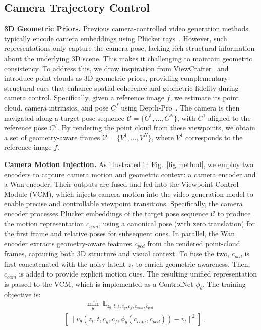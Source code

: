 \subsection{Camera Trajectory Control}
\label{sec:CMM}
\noindent\textbf{3D Geometric Priors.}
Previous camera-controlled video generation methods typically encode camera embeddings using Pl{\"u}cker rays~\cite{bahmani2024ac3d, liang2024wonderland}. 
However, such representations only capture the camera pose, lacking rich structural information about the underlying 3D scene. This makes it challenging to maintain geometric consistency. To address this, we draw inspiration from ViewCrafter~\cite{yu2024viewcrafter} and introduce point clouds as 3D geometric priors, providing complementary structural cues that enhance spatial coherence and geometric fidelity during camera control.
Specifically, given a reference image $f$, we estimate its point cloud, camera intrinsics, and pose $C^f$ using Depth-Pro~\cite{bochkovskii2024depth}. 
The camera is then navigated along a target pose sequence $\mathcal{C} = \{C^1, \ldots, C^N\}$, 
with $C^1$ aligned to the reference pose $C^f$.
By rendering the point cloud from these viewpoints, we obtain a set of geometry-aware frames 
$\mathcal{V} = \{V^{1}, \ldots, V^{N}\}$, where $V^{1}$ corresponds to the reference image $f$.

\vspace{1mm}
\noindent\textbf{Camera Motion Injection.} 
As illustrated in Fig.~\ref{fig:method}, we employ two encoders to capture camera motion and geometric context: a camera encoder and a Wan encoder. Their outputs are fused and fed into the Viewpoint Control Module (VCM), which injects camera motion into the video generation model to enable precise and controllable viewpoint transitions.
Specifically, the camera encoder processes Pl{\"u}cker embeddings of the target pose sequence $\mathcal{C}$ to produce the motion representation $c_{{cam}}$, 
using a canonical pose (with zero translation) for the first frame and relative poses for subsequent ones. 
In parallel, the Wan encoder extracts geometry-aware features $c_{{pcd}}$ from the rendered point-cloud frames, capturing both 3D structure and visual context.
%
To fuse the two, $c_{{pcd}}$ is first concatenated with the noisy latent $z_t$ to enrich geometric awareness. Then, $c_{{cam}}$ is added to provide explicit motion cues. The resulting unified representation is passed to the VCM, which is implemented as a ControlNet $\phi_{\theta}$.
The training objective is:
\begin{equation}
\label{eq:diffusion-cam-motion}
\begin{aligned}
    &\hspace{3em}
    \min_\theta \; \mathbb{E}_{z_0, t, \epsilon, c_{y}, c_{f}, c_{cam}, c_{pcd}} \\
    &\left[\|v_\theta(z_t, t, c_{y}, c_{f},
    \phi_{\theta}(c_{cam}, c_{pcd})) - v_t\|^2\right].
\end{aligned}
\end{equation}

